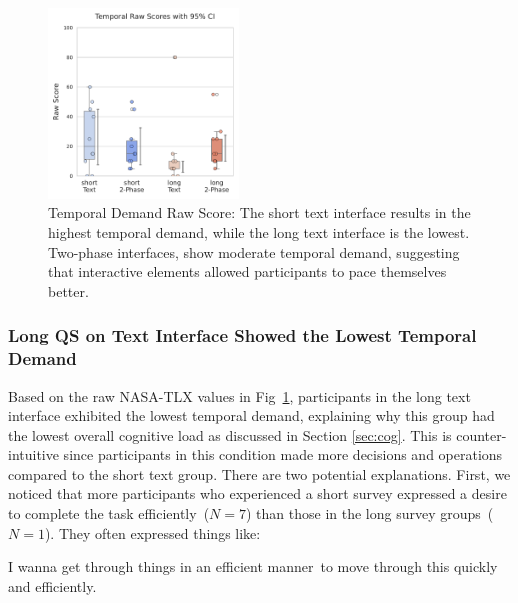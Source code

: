 \begin{figure} %
    \centering
    \includegraphics[width=0.45\textwidth, trim=0 13 0 13, clip]{content/image/cog/Temporal_scores.pdf}
    \captionsetup{width=0.45\textwidth, justification=justified} %
    \caption{Temporal Demand Raw Score: The short text interface results in the highest temporal demand, while the long text interface is the lowest. Two-phase interfaces, show moderate temporal demand, suggesting that interactive elements allowed participants to pace themselves better.}
    \label{fig:temporal_cog_score}
\end{figure}

\subsubsection{Long QS on Text Interface Showed the Lowest Temporal Demand} Based on the raw NASA-TLX values in Fig~\ref{fig:temporal_cog_score}, participants in the long text interface exhibited the lowest temporal demand, explaining why this group had the lowest overall cognitive load 
as discussed in Section \ref{sec:cog}. This is counter-intuitive since participants in this condition made more decisions and operations compared to the short text group. There are two potential explanations. First, we noticed that more participants who experienced a short survey expressed a desire to complete the task efficiently~($N=7$) than those in the long survey groups~($N=1$). They often expressed things like:

\begin{displayquote}
I wanna get through things in an efficient manner~\bracketellipsis to move through this quickly and efficiently. \hfill{}
\end{displayquote}


